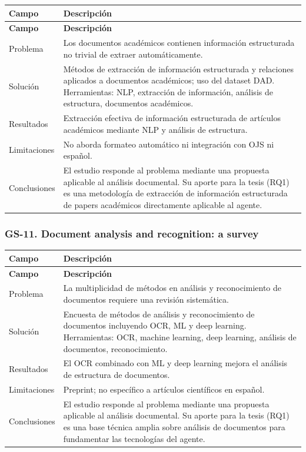 \begin{longtable}{@{}>{\raggedright\arraybackslash}p{}>{\raggedright\arraybackslash}p{}@{}}
\toprule
\textbf{Campo} & \textbf{Descripción} \\
\midrule
\endfirsthead
\toprule
\textbf{Campo} & \textbf{Descripción} \\
\midrule
\endhead
\bottomrule
\endfoot
\endlastfoot
Problema & Los documentos académicos contienen información estructurada no trivial de extraer automáticamente. \\
Solución & Métodos de extracción de información estructurada y relaciones aplicados a documentos académicos; uso del dataset DAD. Herramientas: NLP, extracción de información, análisis de estructura, documentos académicos. \\
Resultados & Extracción efectiva de información estructurada de artículos académicos mediante NLP y análisis de estructura. \\
Limitaciones & No aborda formateo automático ni integración con OJS ni español. \\
Conclusiones & El estudio responde al problema mediante una propuesta aplicable al análisis documental. Su aporte para la tesis (RQ1) es una metodología de extracción de información estructurada de papers académicos directamente aplicable al agente. \\
\end{longtable}

\subsubsection*{GS-11. Document analysis and recognition: a survey}

\begin{longtable}{@{}>{\raggedright\arraybackslash}p{}>{\raggedright\arraybackslash}p{}@{}}
\toprule
\textbf{Campo} & \textbf{Descripción} \\
\midrule
\endfirsthead
\toprule
\textbf{Campo} & \textbf{Descripción} \\
\midrule
\endhead
\bottomrule
\endfoot
\endlastfoot
Problema & La multiplicidad de métodos en análisis y reconocimiento de documentos requiere una revisión sistemática. \\
Solución & Encuesta de métodos de análisis y reconocimiento de documentos incluyendo OCR, ML y deep learning. Herramientas: OCR, machine learning, deep learning, análisis de documentos, reconocimiento. \\
Resultados & El OCR combinado con ML y deep learning mejora el análisis de estructura de documentos. \\
Limitaciones & Preprint; no específico a artículos científicos en español. \\
Conclusiones & El estudio responde al problema mediante una propuesta aplicable al análisis documental. Su aporte para la tesis (RQ1) es una base técnica amplia sobre análisis de documentos para fundamentar las tecnologías del agente. \\
\end{longtable}

